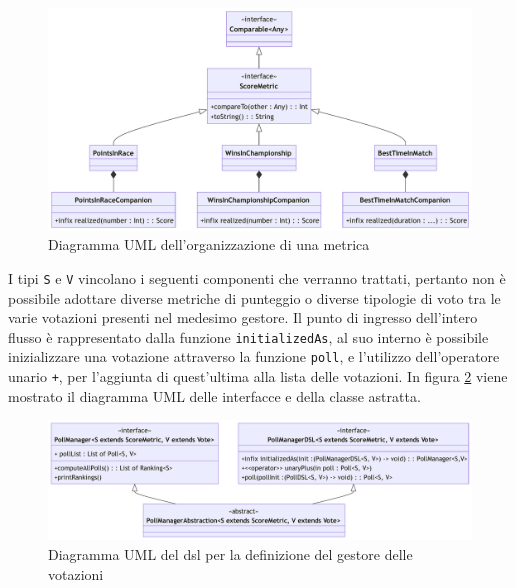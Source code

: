 \documentclass[12pt,a4paper,openright,twoside]{book}
\begin{document}
\vfill
\begin{center} 
\begin{figure}[H]
    \centering
     \includegraphics[width=1.1\linewidth]{figures/scoremetric.pdf}
     \caption{Diagramma UML dell'organizzazione di una metrica}
    \label{fig:metrica}
 \end{figure}
\end{center}
\vfill

I tipi \texttt{S} e \texttt{V} vincolano i seguenti componenti che verranno trattati, pertanto non è possibile adottare diverse metriche di punteggio
o diverse tipologie di voto tra le varie votazioni presenti nel medesimo gestore.
Il punto di ingresso dell'intero flusso è rappresentato dalla funzione \texttt{initializedAs}, al suo interno è possibile inizializzare una votazione attraverso 
la funzione \texttt{poll}, e l'utilizzo dell'operatore unario \texttt{+}, per l'aggiunta di quest'ultima alla lista delle votazioni.
In figura \ref{fig:pollManagerDSL} viene mostrato il diagramma UML delle interfacce e della classe astratta.
\vfill
\begin{center} 
\begin{figure}[H]
    \centering
     \includegraphics[width=1.1\linewidth]{figures/pollManagerDSL.pdf}
     \caption{Diagramma UML del \ac{dsl} per la definizione del gestore delle votazioni}
    \label{fig:pollManagerDSL}
 \end{figure}
\end{center}
\vfill
 \newpage
\end{document}
